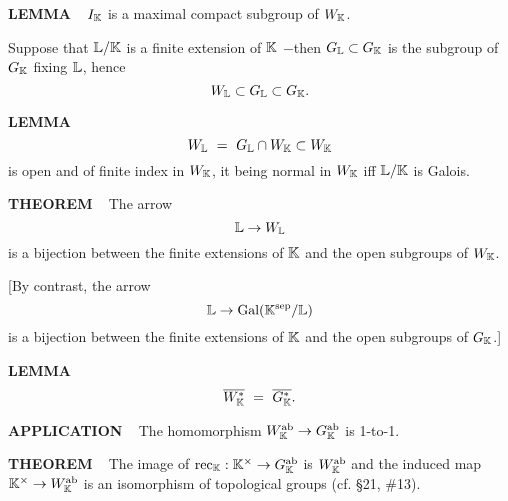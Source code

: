 \vspace{0.1cm}

\begin{x}{\small\bf LEMMA} \ %
$I_{\mathbb{K}}$ is a maximal compact subgroup of $W_{\mathbb{K}}$.
\end{x}

\vspace{0.1cm}

Suppose that $\mathbb{L} / \mathbb{K}$ is a finite extension of $\mathbb{K}$ $-$then $G_{\mathbb{L}} \subset G_{\mathbb{K}}$ is the subgroup of $G_{\mathbb{K}}$ fixing $\mathbb{L}$, hence 
\[
W_{\mathbb{L}} \subset G_{\mathbb{L}} \subset G_{\mathbb{K}}.
\]

\begin{x}{\small\bf LEMMA} \ %
\[
W_{\mathbb{L}} \ = \  G_{\mathbb{L}} \cap W_{\mathbb{K}} \subset W_{\mathbb{K}}
\]
is open and of finite index in $W_{\mathbb{K}}$, it being normal in $W_{\mathbb{K}}$ iff $\mathbb{L} / \mathbb{K}$ is Galois.
\end{x}

\vspace{0.1cm}

\begin{x}{\small\bf THEOREM} \ %
The arrow 
\[
\mathbb{L} \rightarrow  W_{\mathbb{L}}
\]
is a bijection between the finite extensions of $\mathbb{K}$ and the open subgroups of $W_{\mathbb{K}}$.

\vspace{0.1cm}

[By contrast, the arrow 
\[
\mathbb{L} \rightarrow \text{Gal}(\mathbb{K}^{\text{sep}} / \mathbb{L})
\]
is a bijection between the finite extensions of $\mathbb{K}$ and the open subgroups of $G_{\mathbb{K}}$.]
\end{x}

\vspace{0.1cm}

\begin{x}{\small\bf LEMMA} \ %
\[
\overline{W_{\mathbb{K}}^*} \ = \ \overline{G_{\mathbb{K}}^*} .
\]
\end{x}

\vspace{0.1cm}

\begin{x}{\small\bf APPLICATION} \ %
The homomorphism $W_{\mathbb{K}}^{\text{ab}} \rightarrow G_{\mathbb{K}}^{\text{ab}}$ is 1-to-1.
\end{x}
\vspace{0.1cm}

\begin{x}{\small\bf THEOREM} \ %
The image of 
$\text{rec}_{\mathbb{K}}:\mathbb{K}^\times \rightarrow G_{\mathbb{K}}^{\text{ab}}$ is $W_{\mathbb{K}}^{\text{ab}}$ and the induced map $\mathbb{K}^\times \rightarrow W_{\mathbb{K}}^{\text{ab}}$ is an isomorphism of topological groups (cf. \S21, \#13).
\end{x}
\vspace{0.1cm}

